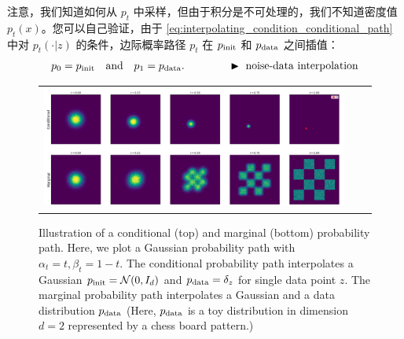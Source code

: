 注意，我们知道如何从 $p_t$ 中采样，但由于积分是不可处理的，我们不知道密度值 $p_t(x)$。您可以自己验证，由于 \cref{eq:interpolating_condition_conditional_path} 中对 $p_t(\cdot|z)$ 的条件，边际概率路径 $p_t$ 在 $p_{\rm{init}}$ 和 $p_{\rm{data}}$ 之间插值：
\begin{align}
\label{eq:noise_interpolation}
p_0 =p_{\rm{init}}\quad\text{and}\quad p_1=p_{\rm{data}}.\quad\quad\quad\quad \blacktriangleright\,\,\text{noise-data interpolation}
\end{align}
\begin{figure}[!t]
    \centering
    \begin{tabular}{ccc}
\includegraphics[width=\textwidth]{figures/conditional_vs_marginal.png} &
    \end{tabular}
\caption{\label{fig:cond_marginal_path_histograms}Illustration of a conditional (top) and marginal (bottom) probability path. Here, we plot a Gaussian probability path with $\alpha_t=t,\beta_t=1-t$. The conditional probability path interpolates a Gaussian $p_{\rm{init}}=\mathcal{N}(0,I_d)$ and $p_{\rm{data}}=\delta_{z}$ for single data point $z$. The marginal probability path interpolates a Gaussian and a data distribution $p_{\rm{data}}$ (Here, $p_{\rm{data}}$ is a toy distribution in dimension $d=2$ represented by a chess board pattern.)}
\end{figure}
